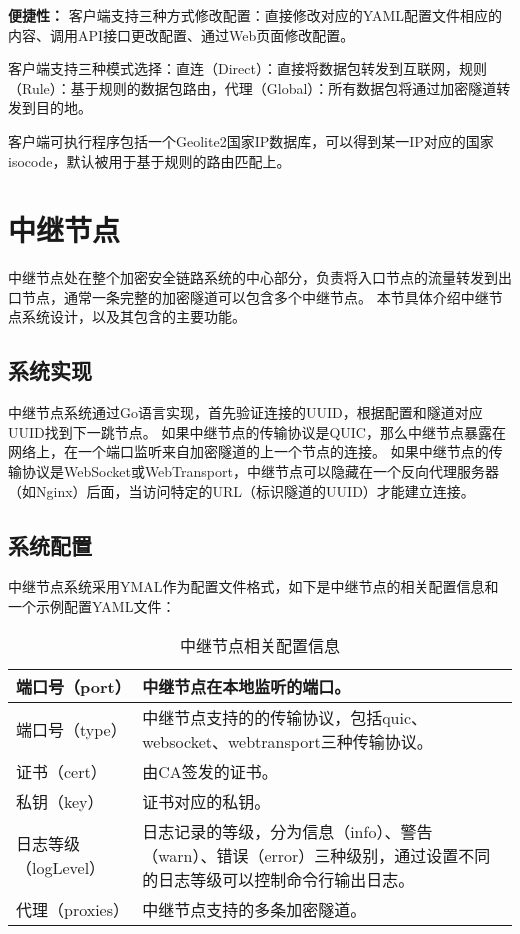 \textbf{便捷性：}
客户端支持三种方式修改配置：直接修改对应的YAML配置文件相应的内容、调用API接口更改配置、通过Web页面修改配置。

客户端支持三种模式选择：直连（Direct）：直接将数据包转发到互联网，规则（Rule）：基于规则的数据包路由，代理（Global）：所有数据包将通过加密隧道转发到目的地。

客户端可执行程序包括一个Geolite2国家IP数据库，可以得到某一IP对应的国家isocode，默认被用于基于规则的路由匹配上。

\section{中继节点}
中继节点处在整个加密安全链路系统的中心部分，负责将入口节点的流量转发到出口节点，通常一条完整的加密隧道可以包含多个中继节点。
本节具体介绍中继节点系统设计，以及其包含的主要功能。

\subsection{系统实现}
中继节点系统通过Go语言实现，首先验证连接的UUID，根据配置和隧道对应UUID找到下一跳节点。
如果中继节点的传输协议是QUIC，那么中继节点暴露在网络上，在一个端口监听来自加密隧道的上一个节点的连接。
如果中继节点的传输协议是WebSocket或WebTransport，中继节点可以隐藏在一个反向代理服务器（如Nginx）后面，当访问特定的URL（标识隧道的UUID）才能建立连接。

\subsection{系统配置}
中继节点系统采用YMAL作为配置文件格式，如下是中继节点的相关配置信息和一个示例配置YAML文件：

\begin{table}[H]
  \begin{tabular}{| m{10em} | m{24em} |}
  \hline
  端口号（port） & 中继节点在本地监听的端口。  \\ \hline
  端口号（type） & 中继节点支持的的传输协议，包括quic、websocket、webtransport三种传输协议。  \\ \hline
  证书（cert） & 由CA签发的证书。  \\ \hline
  私钥（key） & 证书对应的私钥。  \\ \hline
  日志等级（logLevel）  & 日志记录的等级，分为信息（info）、警告（warn）、错误（error）三种级别，通过设置不同的日志等级可以控制命令行输出日志。 \\ \hline    
  代理（proxies）  & 中继节点支持的多条加密隧道。 \\ \hline              
  \end{tabular}
  \caption{中继节点相关配置信息}
\end{table}


